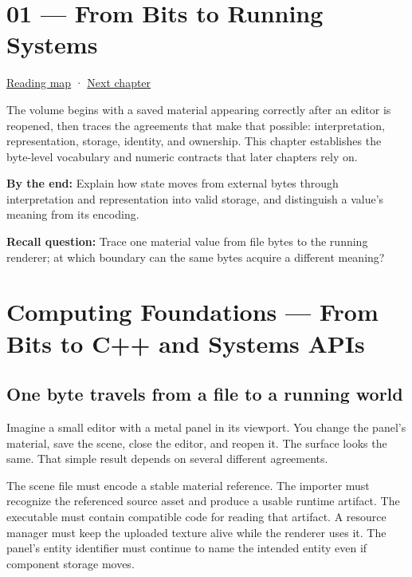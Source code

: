 \hypertarget{01-foundations-i-ch001}{}
\chapter{01 --- From Bits to Running Systems}\label{01-foundations-i-ch001-from-bits-to-running-systems}

\hyperref[volume-reading-map]{Reading map} · \hyperref[01-foundations-i-ch002]{Next chapter}

The volume begins with a saved material appearing correctly after an editor is reopened, then traces the agreements that make that possible: interpretation, representation, storage, identity, and ownership. This chapter establishes the byte-level vocabulary and numeric contracts that later chapters rely on.

\textbf{By the end:} Explain how state moves from external bytes through interpretation and representation into valid storage, and distinguish a value's meaning from its encoding.

\textbf{Recall question:} Trace one material value from file bytes to the running renderer; at which boundary can the same bytes acquire a different meaning?

\chapter{Computing Foundations --- From Bits to C++ and Systems APIs}\label{01-foundations-i-ch001-computing-foundations-from-bits-to-c-and-systems-apis}

\section{One byte travels from a file to a running world}\label{01-foundations-i-ch001-one-byte-travels-from-a-file-to-a-running-world}

Imagine a small editor with a metal panel in its viewport. You change the panel's material, save the scene, close the editor, and reopen it. The surface looks the same. That simple result depends on several different agreements.

The scene file must encode a stable material reference. The importer must recognize the referenced source asset and produce a usable runtime artifact. The executable must contain compatible code for reading that artifact. A resource manager must keep the uploaded texture alive while the renderer uses it. The panel's entity identifier must continue to name the intended entity even if component storage moves.

